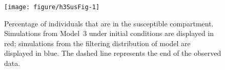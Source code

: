 \begin{figure}[!ht]
\begin{knitrout}
\color{fgcolor}

{\centering \texttt{[image: figure/h3SusFig-1]} 

}


\end{knitrout}
\caption{\label{fig:h3Sus}Percentage of individuals that are in the susceptible compartment.
Simulations from Model~3 under initial conditions are displayed in red; simulations from the filtering distribution of model are displayed in blue.
The dashed line represents the end of the observed data.}
\end{figure}


